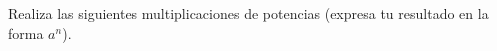 \question[10] Realiza las siguientes multiplicaciones de potencias (expresa tu resultado en la forma $a^n$).
\begin{multicols}{2}
    \begin{parts}
        {\printanswers
            
        }
        
        
        
        
        
        
        
        
        
        
    \end{parts}
\end{multicols}
